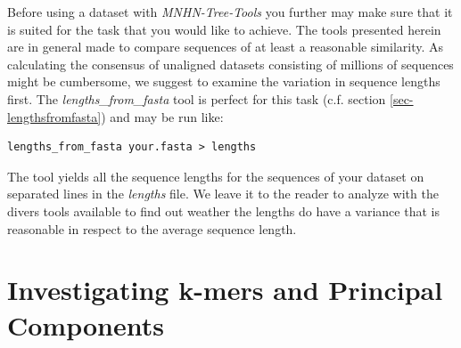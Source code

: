 Before using a dataset with \emph{MNHN-Tree-Tools} you further may make
sure that it is suited for the task that you would like to
achieve. The tools presented herein are in general made to
compare sequences of at least a reasonable similarity. As calculating
the consensus of unaligned datasets consisting of millions of
sequences might be cumbersome, we suggest to
examine the variation in sequence lengths first. The
\emph{lengths\_from\_fasta} tool is perfect for this task (c.f. section
\ref{sec-lengthsfromfasta}) and may be run like:
\begin{lstlisting}
lengths_from_fasta your.fasta > lengths
\end{lstlisting}
The tool yields all the sequence lengths for the sequences of your
dataset on separated lines in the \emph{lengths} file. We leave it to
the reader to analyze with the divers tools available to find out weather
the lengths do have a variance that is reasonable in respect to
the average sequence length. 

\section{Investigating k-mers and Principal Components}

